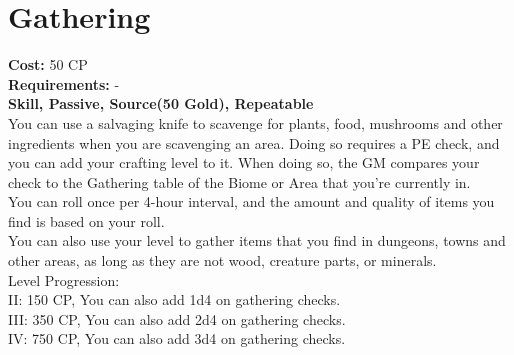 \section{Gathering}\label{perk:gathering}
\textbf{Cost:} 50 CP\\
\textbf{Requirements:} -\\
\textbf{Skill, Passive, Source(50 Gold), Repeatable}\\
You can use a salvaging knife to scavenge for plants, food, mushrooms and other ingredients when you are scavenging an area.
Doing so requires a PE check, and you can add your crafting level to it.
When doing so, the GM compares your check to the Gathering table of the Biome or Area that you're currently in.\\
You can roll once per 4-hour interval, and the amount and quality of items you find is based on your roll.\\
You can also use your level to gather items that you find in dungeons, towns and other areas, as long as they are not wood, creature parts, or minerals.
\\
Level Progression:\\
II: 150 CP, You can also add 1d4 on gathering checks.\\
III: 350 CP, You can also add 2d4 on gathering checks.\\
IV: 750 CP, You can also add 3d4 on gathering checks.\\